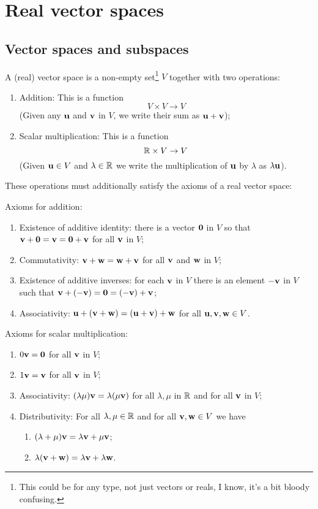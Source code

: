 \documentclass[10pt, a4paper]{article}
\begin{document}
\newpage

\section{Real vector spaces}

\subsection{Vector spaces and subspaces}
A (real) vector space is a non-empty set\footnote{This could be for any type,
not just vectors or reals,
I know,
it's a bit bloody confusing.}
$V$ together with two operations:
\begin{enumerate}[label = (\roman*)]
    \item Addition:
    This is a function
    \[
    V \times V \rightarrow V
    \]
    (Given any $\mathbf{u}$ and $\mathbf{v}$ in $V$,
    we write their sum as $\mathbf{u + v}$);
    \item Scalar multiplication:
    This is a function
    \[
    \mathbb{R} \times V \rightarrow V
    \]
    (Given $\mathbf{u} \in V$ and $\lambda \in \mathbb{R}$ we write the multiplication of $\mathbf{u}$ by $\lambda$ as $\lambda\mathbf{u}$).
\end{enumerate}

These operations must additionally satisfy the axioms of a real vector space:

Axioms for addition:
\begin{enumerate}[label = (\roman*)]
    \item Existence of additive identity:
    there is a vector $\mathbf{0}$ in $V$ so that $\mathbf{v + 0} = \mathbf{v} = \mathbf{0 + v}$ for all $\mathbf{v}$ in $V$;
    \item Commutativity:
    $\mathbf{v + w} = \mathbf{w + v}$ for all $\mathbf{v}$ and $\mathbf{w}$ in $V$;
    \item Existence of additive inverses:
    for each $\mathbf{v}$ in $V$ there is an element $-\mathbf{v}$ in $V$ such that $\mathbf{v} + (-\mathbf{v}) = \mathbf{0} = (-\mathbf{v}) + \mathbf{v}$;
    \item Associativity:
    $\mathbf{u} + (\mathbf{v + w}) = (\mathbf{u + v}) + \mathbf{w}$ for all $\mathbf{u, v, w} \in V$.
\end{enumerate}

Axioms for scalar multiplication:
\begin{enumerate}[label = (\roman*)]
    \item $0\mathbf{v} = \mathbf{0}$ for all $\mathbf{v}$ in $V$;
    \item $1\mathbf{v} = \mathbf{v}$ for all $\mathbf{v}$ in $V$;
    \item Associativity:
    $(\lambda\mu)\mathbf{v} = \lambda(\mu\mathbf{v})$ for all $\lambda, \mu$ in $\mathbb{R}$ and for all $\mathbf{v}$ in $V$;
    \item Distributivity:
    For all $\lambda, \mu \in \mathbb{R}$ and for all $\mathbf{v, w} \in V$ we have
    \begin{enumerate}[label = \alph*)]
        \item $(\lambda + \mu)\mathbf{v} = \lambda\mathbf{v} + \mu\mathbf{v}$;
        \item $\lambda(\mathbf{v + w}) = \lambda\mathbf{v} + \lambda\mathbf{w}$.
    \end{enumerate}
\end{enumerate}
\end{document}
